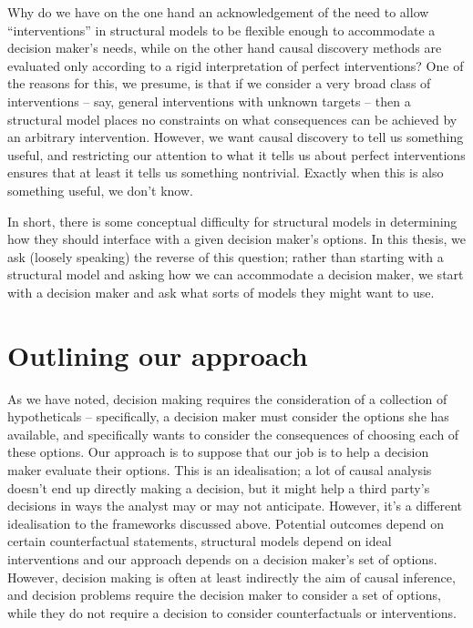 Why do we have on the one hand an acknowledgement of the need to allow ``interventions'' in structural models to be flexible enough to accommodate a decision maker's needs, while on the other hand causal discovery methods are evaluated only according to a rigid interpretation of perfect interventions? One of the reasons for this, we presume, is that if we consider a very broad class of interventions -- say, general interventions with unknown targets -- then a structural model places no constraints on what consequences can be achieved by an arbitrary intervention. However, we want causal discovery to tell us something useful, and restricting our attention to what it tells us about perfect interventions ensures that at least it tells us something nontrivial. Exactly when this is also something useful, we don't know.

In short, there is some conceptual difficulty for structural models in determining how they should interface with a given decision maker's options. In this thesis, we ask (loosely speaking) the reverse of this question; rather than starting with a structural model and asking how we can accommodate a decision maker, we start with a decision maker and ask what sorts of models they might want to use.

\section{Outlining our approach}

As we have noted, decision making requires the consideration of a collection of hypotheticals -- specifically, a decision maker must consider the options she has available, and specifically wants to consider the consequences of choosing each of these options. Our approach is to suppose that our job is to help a decision maker evaluate their options. This is an idealisation; a lot of causal analysis doesn't end up directly making a decision, but it might help a third party's decisions in ways the analyst may or may not anticipate. However, it's a different idealisation to the frameworks discussed above. Potential outcomes depend on certain counterfactual statements, structural models depend on ideal interventions and our approach depends on a decision maker's set of options. However, decision making is often at least indirectly the aim of causal inference, and decision problems require the decision maker to consider a set of options, while they do not require a decision to consider counterfactuals or interventions. 

